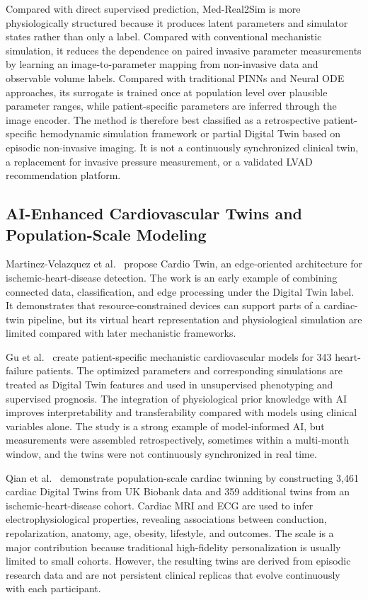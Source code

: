 Compared with direct supervised prediction, Med-Real2Sim is more physiologically structured because it produces latent parameters and simulator states rather than only a label. Compared with conventional mechanistic simulation, it reduces the dependence on paired invasive parameter measurements by learning an image-to-parameter mapping from non-invasive data and observable volume labels. Compared with traditional PINNs and Neural ODE approaches, its surrogate is trained once at population level over plausible parameter ranges, while patient-specific parameters are inferred through the image encoder. The method is therefore best classified as a retrospective patient-specific hemodynamic simulation framework or partial Digital Twin based on episodic non-invasive imaging. It is not a continuously synchronized clinical twin, a replacement for invasive pressure measurement, or a validated LVAD recommendation platform.

\subsection{AI-Enhanced Cardiovascular Twins and Population-Scale Modeling}
Martinez-Velazquez et al.~\cite{martinez2019cardiotwin} propose Cardio Twin, an edge-oriented architecture for ischemic-heart-disease detection. The work is an early example of combining connected data, classification, and edge processing under the Digital Twin label. It demonstrates that resource-constrained devices can support parts of a cardiac-twin pipeline, but its virtual heart representation and physiological simulation are limited compared with later mechanistic frameworks.

Gu et al.~\cite{gu2025heartfailure} create patient-specific mechanistic cardiovascular models for 343 heart-failure patients. The optimized parameters and corresponding simulations are treated as Digital Twin features and used in unsupervised phenotyping and supervised prognosis. The integration of physiological prior knowledge with AI improves interpretability and transferability compared with models using clinical variables alone. The study is a strong example of model-informed AI, but measurements were assembled retrospectively, sometimes within a multi-month window, and the twins were not continuously synchronized in real time.

Qian et al.~\cite{qian2025populations} demonstrate population-scale cardiac twinning by constructing 3,461 cardiac Digital Twins from UK Biobank data and 359 additional twins from an ischemic-heart-disease cohort. Cardiac MRI and ECG are used to infer electrophysiological properties, revealing associations between conduction, repolarization, anatomy, age, obesity, lifestyle, and outcomes. The scale is a major contribution because traditional high-fidelity personalization is usually limited to small cohorts. However, the resulting twins are derived from episodic research data and are not persistent clinical replicas that evolve continuously with each participant.

